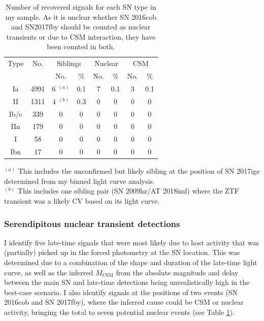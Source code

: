 \documentclass[a4paper,oneside,12pt, class=Latex/Classes/PhDthesisPSnPDF, crop=false]{standalone}
\begin{document}
\begin{table}[h!]
   \caption[Number of recovered signals for each SN type.]{Number of recovered signals for each SN type in my sample. As it is unclear whether SN 2016cob and SN2017fby should be counted as nuclear transients or due to CSM interaction, they have been counted in both.}
    \centering
    \begin{tabular}{cccccccc}
        \hline
        \hline
        Type & No.  & \multicolumn{2}{c}{Siblings}  & \multicolumn{2}{c}{Nuclear} &  \multicolumn{2}{c}{CSM}  \\
        && No. & \% & No. & \%& No. & \% \\
        \hline
        Ia & 4991 & 6 $^{(a)}$ & 0.1 & 7 & 0.1 & 3 & 0.1\\
        II & 1311 & 4 $^{(b)}$ & 0.3 &  0 & 0 & 0 & 0 \\
        Ib/c & 339 & 0 & 0 & 0 & 0 & 0 & 0 \\
        IIn & 179 & 0 & 0 & 0 & 0 & 0 & 0 \\
        I & 58 & 0 & 0 & 0 & 0 & 0 & 0 \\
       Ibn & 17 & 0 & 0 & 0 & 0 & 0 & 0 \\
        \hline
    \end{tabular}
     \label{recovered_obj_breakdown}
    \begin{flushleft}
        $^{(a)}$ This includes the unconfirmed but likely sibling at the position of SN 2017ige determined from my binned light curve analysis.\\
        $^{(b)}$ This includes one sibling pair (SN 2009hz/AT 2018iml) where the ZTF transient was a likely CV based on its light curve.\\
    \end{flushleft}
\end{table}


\subsubsection{Serendipitous nuclear transient detections}
\label{sec:discussion:nuclear}
I identify five late-time signals that were most likely due to host activity that was (partially) picked up in the forced photometry at the SN location. This was determined due to a combination of the shape and duration of the late-time light curve, as well as the inferred $M_\text{CSM}$ from the absolute magnitude and delay between the main SN and late-time detections being unrealistically high in the best-case scenario. I also identify signals at the positions of two events (SN 2016cob and SN 2017fby), where the inferred cause could be CSM or nuclear activity, bringing the total to seven potential nuclear events (see Table \ref{recovered_obj_breakdown}).
\end{document}
